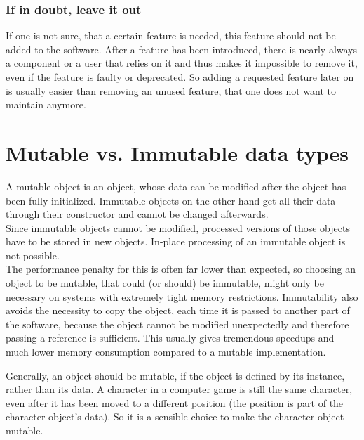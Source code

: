		\subsubsection{If in doubt, leave it out}
			If one is not sure, that a certain feature is needed, this feature should not be added to the software.
			After a feature has been introduced, there is nearly always a component or a user that relies on it and thus makes it impossible to remove it, even if the feature is faulty or deprecated.
			So adding a requested feature later on is usually easier than removing an unused feature, that one does not want to maintain anymore.


	\section{Mutable vs. Immutable data types}
		A mutable object is an object, whose data can be modified after the object has been fully initialized.
		Immutable objects on the other hand get all their data through their constructor and cannot be changed afterwards.\\
		Since immutable objects cannot be modified, processed versions of those objects have to be stored in new objects.
		In-place processing of an immutable object is not possible.\\
		The performance penalty for this is often far lower than expected, so choosing an object to be mutable, that could (or should) be immutable, might only be necessary on systems with extremely tight memory restrictions.
		Immutability also avoids the necessity to copy the object, each time it is passed to another part of the software, because the object cannot be modified unexpectedly and therefore passing a reference is sufficient.
		This usually gives tremendous speedups and much lower memory consumption compared to a mutable implementation.

		Generally, an object should be mutable, if the object is defined by its instance, rather than its data.
		A character in a computer game is still the same character, even after it has been moved to a different position (the position is part of the character object's data).
		So it is a sensible choice to make the character object mutable.

